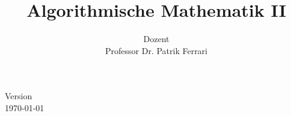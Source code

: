 \documentclass[a4paper,german]{article}
\title{Algorithmische Mathematik II}
\author{{\normalsize Dozent} \\ {\sc Professor Dr. Patrik Ferrari}}
\begin{document}
    \maketitle
    \vspace{3em}
    \centering \small Version \\
    \today\; \currenttime
    \vspace{10em}
    
    \newpage
    \tableofcontents
    \newpage
    
    
    \printindex
\end{document}
